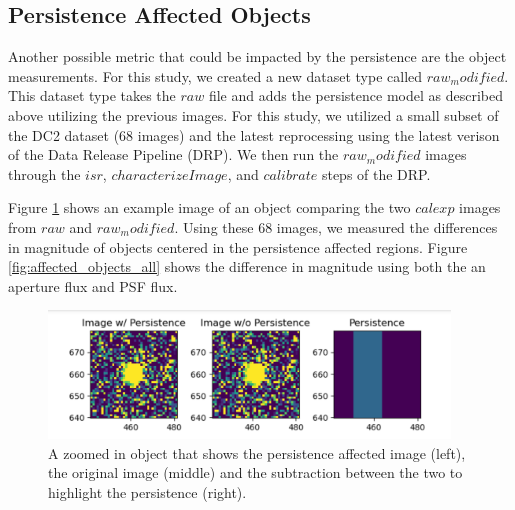 \documentclass[DM,authoryear,toc]{lsstdoc}
\begin{document}
\subsection{Persistence Affected Objects}

Another possible metric that could be impacted by the persistence are the object measurements.
For this study, we created a new dataset type called \texttt{$raw_modified$}. 
This dataset type takes the \texttt{$raw$} file and adds the persistence model as described above utilizing the previous images.
For this study, we utilized a small subset of the DC2 dataset (68 images) and the latest reprocessing using the latest verison of the Data Release Pipeline (DRP).
We then run the \texttt{$raw_modified$} images through the \texttt{$isr$}, \texttt{$characterizeImage$}, and \texttt{$calibrate$} steps of the DRP\@. 

Figure \ref{fig:ex_persistence} shows an example image of an object comparing the two \texttt{$calexp$} images from \texttt{$raw$} and \texttt{$raw_modified$}.
Using these 68 images, we measured the differences in magnitude of objects centered in the persistence affected regions.
Figure \ref{fig:affected_objects_all} shows the difference in magnitude using both the an aperture flux and PSF flux.

\begin{figure}[!htp]
  \centering
  \includegraphics[width=0.95\textwidth, angle=0]{Obj_pers.png}
  \caption{
  A zoomed in object that shows the persistence affected image (left), the original image (middle) 
  and the subtraction between the two to highlight the persistence (right).
  }\label{fig:ex_persistence}
\end{figure}
\end{document}
